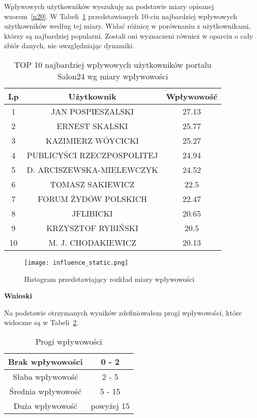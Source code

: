 \documentclass[polish,12pt]{aghthesis}
\begin{document}
Wpływowych użytkowników wyszukuję na podstawie miary opisanej wzorem~\ref{n20}. W Tabeli~\ref{tab:inf} przedstawionych 10-ciu najbardziej wpływowych użytkowników według tej miary. Widać różnicę w porównaniu z użytkownikami, którzy są najbardziej popularni. Zostali oni wyznaczeni również w oparciu o cały zbiór danych, nie uwzględniając dynamiki.

\vspace{5mm}

\begin{table}[h]
\centering
  
\begin{tabular}{ |c|c|c| } 
\hline
 \textbf{Lp} & \textbf{Użytkownik} & \textbf{Wpływowość} \\ [0.5ex] 
 \hline
 \hline     
1 & JAN POSPIESZALSKI & 27.13 \\
2 & ERNEST SKALSKI & 25.77 \\
3 & KAZIMIERZ WÓYCICKI & 25.27 \\
4 & PUBLICYŚCI RZECZPOSPOLITEJ & 24.94 \\
5 & D. ARCISZEWSKA-MIELEWCZYK & 24.52 \\
6 & TOMASZ SAKIEWICZ & 22.5 \\
7 & FORUM ŻYDÓW POLSKICH & 22.47 \\
8 & JFLIBICKI & 20.65 \\
9 & KRZYSZTOF RYBIŃSKI & 20.5 \\
10 & M. J. CHODAKIEWICZ & 20.13 \\
  \hline
\end{tabular}
\caption{TOP 10 najbardziej wpływowych użytkowników portalu Salon24 wg miary wpływowości}
\label{tab:inf}
\end{table}


\begin{figure}[ht]
    \centering
    \texttt{[image: influence\_static.png]}
    \caption[Wpływowi użytkownicy - histogram]{Histogram przedstawiający rozkład miary wpływowości}
    \label{fig:influence_static}
\end{figure}

\FloatBarrier

\textbf{Wnioski}

\vspace{5mm}

Na podstawie otrzymanych wyników zdefiniowałem progi wpływowości, które widoczne są w Tabeli~\ref{tab:progi_inf}.

\begin{table}[h]
\centering
\begin{tabular}{|c|c|}
\hline
Brak wpływowości & 0 - 2 \\
\hline
Słaba wpływowość & 2 - 5 \\
\hline
Średnia wpływowość & 5 - 15 \\
\hline
Duża wpływowość & powyżej 15 \\
\hline
\end{tabular}
\caption[Progi wpływowości]{Progi wpływowości}
\label{tab:progi_inf}
\end{table}
\end{document}
